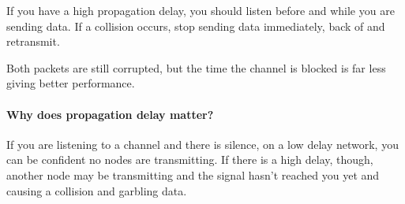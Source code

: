 If you have a high propagation delay, you should listen before and while you are sending data.
If a collision occurs, stop sending data immediately, back of and retransmit.
\begin{note}
	Both packets are still corrupted, but the time the channel is blocked is far less giving better performance.
\end{note}

\paragraph{Why does propagation delay matter?}\label{par:why_does_propagation_delay_matter_}

If you are listening to a channel and there is silence, on a low delay network, you can be confident no nodes are transmitting.
If there is a high delay, though, another node may be transmitting and the signal hasn't reached you yet and causing a collision and garbling data.


